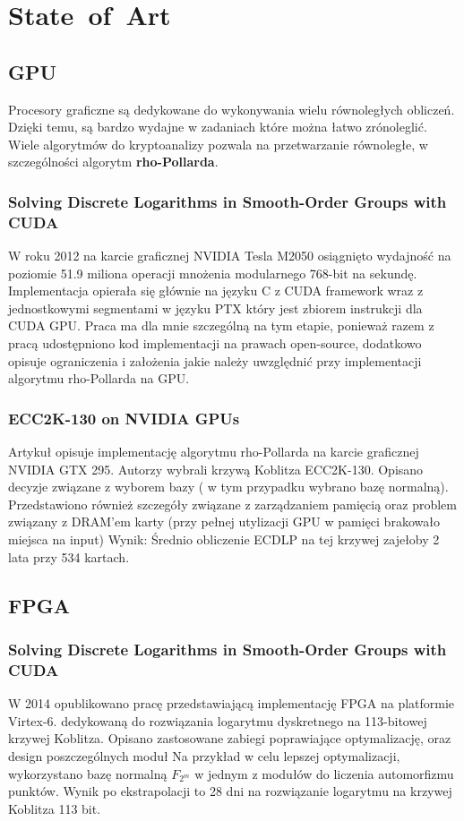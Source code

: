 \newpage %
\section{State~of~Art}
\label{sc:state}

\subsection{GPU}
Procesory graficzne są dedykowane do wykonywania wielu równoległych obliczeń.
Dzięki temu, są bardzo wydajne w zadaniach które można łatwo zrónoleglić.
Wiele algorytmów do kryptoanalizy pozwala na przetwarzanie równoległe, 
w szczególności algorytm \textbf{rho-Pollarda}.
\subsubsection*{Solving Discrete Logarithms in Smooth-Order Groups with CUDA}
W roku 2012 na karcie graficznej NVIDIA Tesla M2050 osiągnięto wydajność na poziomie
51.9 miliona operacji mnożenia modularnego 768-bit na sekundę.
Implementacja opierała się głównie na języku C z CUDA framework wraz z jednostkowymi segmentami
w języku PTX który jest zbiorem instrukcji dla CUDA GPU.
Praca ma dla mnie szczególną na tym etapie, ponieważ razem z pracą udostępniono kod
implementacji na prawach open-source, dodatkowo opisuje
ograniczenia i założenia jakie należy uwzględnić przy implementacji
algorytmu rho-Pollarda na GPU\cite{henry-goldberg-cuda}.

\subsubsection*{ECC2K-130 on NVIDIA GPUs}
Artykuł opisuje implementację algorytmu rho-Pollarda na karcie graficznej NVIDIA 
GTX 295.
Autorzy wybrali krzywą Koblitza ECC2K-130.
Opisano decyzje związane z wyborem bazy ( w tym przypadku wybrano bazę normalną).
Przedstawiono również szczegóły związane z zarządzaniem pamięcią oraz problem związany
z DRAM'em karty (przy pełnej utylizacji GPU w pamięci brakowało miejsca na input)
Wynik: Średnio obliczenie ECDLP na tej krzywej zajełoby 2 lata przy 534 kartach.

\subsection{FPGA}
\subsubsection*{Solving Discrete Logarithms in Smooth-Order Groups with CUDA}
W 2014 opublikowano pracę przedstawiającą implementację FPGA
na platformie Virtex-6.
dedykowaną do rozwiązania logarytmu dyskretnego na 113-bitowej krzywej Koblitza.
Opisano zastosowane zabiegi poprawiające optymalizację, oraz design
poszczególnych moduł
Na przykład w celu lepszej optymalizacji, wykorzystano bazę normalną
$F_{2^m}$ w jednym z modułów do liczenia automorfizmu punktów.
Wynik po ekstrapolacji to 28 dni na rozwiązanie logarytmu na krzywej Koblitza 113 bit.

